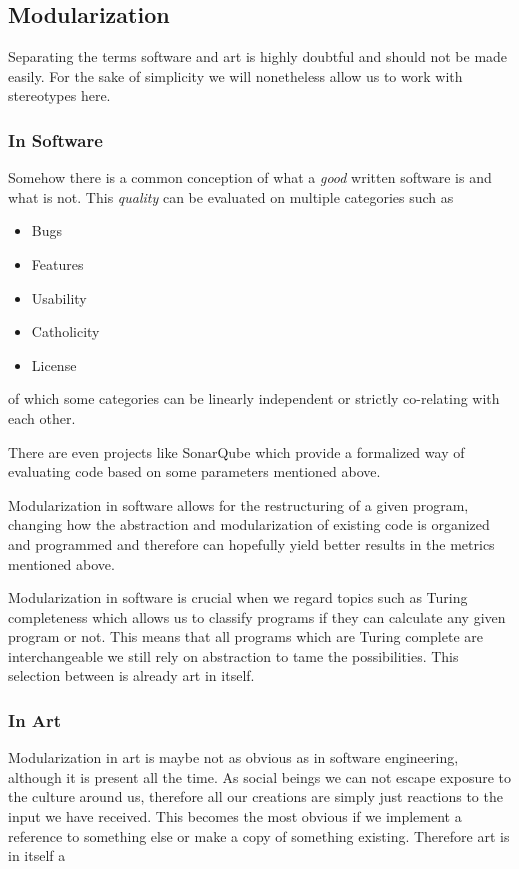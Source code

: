 \documentclass[10pt,twocolumn,letterpaper]{article}
\begin{document}
\subsection{Modularization}

Separating the terms software and art is highly doubtful and should not be made easily.
For the sake of simplicity we will nonetheless allow us to work with stereotypes here.

\subsubsection*{In Software}

Somehow there is a common conception of what a \textit{good} written software is and what is not.
This \textit{quality} can be evaluated on multiple categories such as

\begin{itemize}
    \item Bugs
    \item Features
    \item Usability
    \item Catholicity
    \item License
\end{itemize}

of which some categories can be linearly independent or strictly co-relating with each other.

There are even projects like SonarQube which provide a formalized way of evaluating code based on some
parameters mentioned above.

Modularization in software allows for the restructuring of a given program, changing how the abstraction and
modularization of existing code is organized and programmed and therefore can hopefully yield better
results in the metrics mentioned above.

Modularization in software is crucial when we regard topics such as Turing completeness which allows us
to classify programs if they can calculate any given program or not.
This means that all programs which are Turing complete are interchangeable we still rely on abstraction to
tame the possibilities.
This selection between is already art in itself.

\subsubsection*{In Art}

Modularization in art is maybe not as obvious as in software engineering, although it is present all the time.
As social beings we can not escape exposure to the culture around us, therefore all our creations
are simply just reactions to the input we have received.
This becomes the most obvious if we implement a reference to something else or make a copy of something existing.
Therefore art is in itself a
\end{document}
